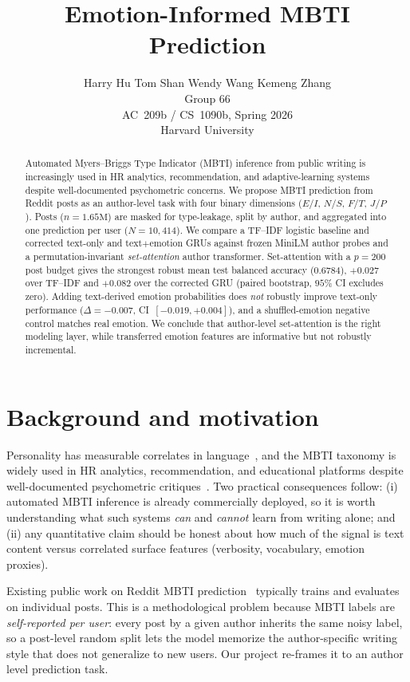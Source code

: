 \documentclass{article}
\title{Emotion-Informed MBTI Prediction}
\author{%
  Harry Hu \quad Tom Shan \quad Wendy Wang \quad Kemeng Zhang \\
  Group 66 \\
  AC~209b / CS~1090b, Spring 2026 \\
  Harvard University
}
\begin{document}
\maketitle

\begin{abstract}
Automated Myers--Briggs Type Indicator (MBTI) inference from public writing is increasingly used in HR analytics, recommendation, and adaptive-learning systems despite well-documented psychometric concerns. We propose MBTI prediction from Reddit posts as an author-level task with four binary dimensions ($E/I$, $N/S$, $F/T$, $J/P$). Posts ($n{=}1.65\text{M}$) are masked for type-leakage, split by author, and aggregated into one prediction per user ($N{=}10{,}414$). We compare a TF--IDF logistic baseline and corrected text-only and text$+$emotion GRUs against frozen MiniLM author probes and a permutation-invariant \emph{set-attention} author transformer. Set-attention with a $p{=}200$ post budget gives the strongest robust mean test balanced accuracy ($0.6784$), $+0.027$ over TF--IDF and $+0.082$ over the corrected GRU (paired bootstrap, $95\%$ CI excludes zero). Adding text-derived emotion probabilities does \emph{not} robustly improve text-only performance ($\Delta{=}{-}0.007$, CI~$[-0.019,+0.004]$), and a shuffled-emotion negative control matches real emotion. We conclude that author-level set-attention is the right modeling layer, while transferred emotion features are informative but not robustly incremental.
\end{abstract}

\section{Background and motivation}

Personality has measurable correlates in language~\citep{pennebaker1999linguistic,mairesse2007using,park2015automatic}, and the MBTI taxonomy is widely used in HR analytics, recommendation, and educational platforms despite well-documented psychometric critiques~\citep{pittenger1993utility}. Two practical consequences follow: (i) automated MBTI inference is already commercially deployed, so it is worth understanding what such systems \emph{can} and \emph{cannot} learn from writing alone; and (ii) any quantitative claim should be honest about how much of the signal is text content versus correlated surface features (verbosity, vocabulary, emotion proxies).

Existing public work on Reddit MBTI prediction~\citep{plank2015personality,gjurkovic2018reddit} typically trains and evaluates on individual posts. This is a methodological problem because MBTI labels are \emph{self-reported per user}: every post by a given author inherits the same noisy label, so a post-level random split lets the model memorize the author-specific writing style that does not generalize to new users. Our project re-frames it to an author level prediction task.
\end{document}
